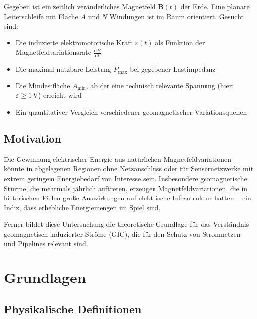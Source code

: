 ﻿\documentclass[a4paper,12pt]{article}
\theoremstyle{definition}
\begin{document}
Gegeben ist ein zeitlich ver\"anderliches Magnetfeld $\mathbf{B}(t)$ der Erde.
Eine planare Leiterschleife mit Fl\"ache $A$ und $N$ Windungen ist im Raum
orientiert. Gesucht sind:

\begin{itemize}
    \item Die induzierte elektromotorische Kraft $\varepsilon(t)$ als Funktion
          der Magnetfeldvariationsrate $\tfrac{\mathrm{d}B}{\mathrm{d}t}$
    \item Die maximal nutzbare Leistung $P_{\max}$ bei gegebener Lastimpedanz
    \item Die Mindestfl\"ache $A_{\min}$, ab der eine technisch relevante
          Spannung (hier: $\varepsilon \geq 1\,\mathrm{V}$) erreicht wird
    \item Ein quantitativer Vergleich verschiedener geomagnetischer Variationsquellen
\end{itemize}

\subsection{Motivation}

Die Gewinnung elektrischer Energie aus nat\"urlichen Magnetfeldvariationen
k\"onnte in abgelegenen Regionen ohne Netzanschluss oder f\"ur
Sensornetzwerke mit extrem geringem Energiebedarf von Interesse sein.
Insbesondere geomagnetische St\"urme, die mehrmals j\"ahrlich auftreten,
erzeugen Magnetfeldvariationen, die in historischen F\"allen gro{\ss}e
Auswirkungen auf elektrische Infrastruktur hatten -- ein Indiz, dass
erhebliche Energiemengen im Spiel sind.

Ferner bildet diese Untersuchung die theoretische Grundlage f\"ur das
Verst\"andnis geomagnetisch induzierter Str\"ome (GIC), die f\"ur
den Schutz von Stromnetzen und Pipelines relevant sind.

\section{Grundlagen}

\subsection{Physikalische Definitionen}
\end{document}
